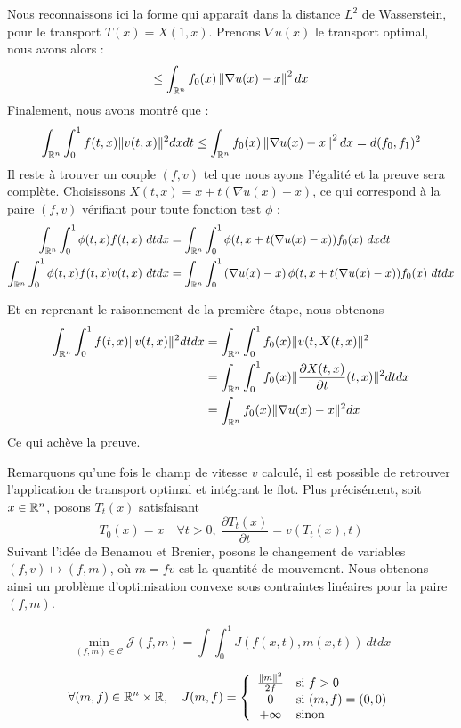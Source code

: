 \documentclass[a4paper,12pt]{article}
\begin{document}
\begin{preuve}
Nous reconnaissons ici la forme qui apparaît dans la distance $L^2$ de Wasserstein, pour le transport $T(x) = X(1,x)$. Prenons $\nabla u(x)$ le transport optimal, nous avons alors :  
$$
\leq \int_{\mathbb{R}^n} f_0(x)\left\| \nabla u(x)-x \right\|^2dx
$$
Finalement, nous avons montré que : 
$$
\int_{\mathbb{R}^n}\int_0^1 f(t,x)\|v(t,x)\|^2dxdt \leq \int_{\mathbb{R}^n} f_0(x)\left\| \nabla u(x)-x \right\|^2dx = d(f_0,f_1)^2
$$
Il reste à trouver un couple $(f,v)$ tel que nous ayons l'égalité et la preuve sera complète. Choisissons $X(t,x) = x+t(\nabla u(x)-x)$, ce qui correspond à la paire $(f,v)$ vérifiant pour toute fonction test $\phi$ : 
\begin{align*}
\int_{\mathbb{R}^n} \int_0^1 \phi(t,x)f(t,x)\ dtdx &=\int_{\mathbb{R}^n} \int_0^1 \phi(t, x+t(\nabla u(x)-x)) f_0(x)\ dxdt \\
\int_{\mathbb{R}^n} \int_0^1 \phi (t,x)f(t,x)v(t,x)\ dtdx &= \int_{\mathbb{R}^n} \int_0^1 \left(\nabla u (x) - x\right) \phi(t, x+t(\nabla u(x)-x)) f_0(x)\ dtdx
\end{align*}


Et en reprenant le raisonnement de la première étape, nous obtenons
\begin{align*}
\int_{\mathbb{R}^n} \int_0^1 f(t,x)\|v(t,x)\|^2dtdx &= \int_{\mathbb{R}^n} \int_0^1 f_0(x)\|v(t,X(t,x)\|^2\\
&= \int_{\mathbb{R}^n} \int_0^1 f_0(x) \|\frac{\partial X(t,x)}{\partial t}(t,x)\|^2 dtdx \\
&= \int_{\mathbb{R}^n} f_0(x) \|\nabla u(x) -x\|^2dx \\
\end{align*}
Ce qui achève la preuve. 
\end{preuve}

Remarquons qu'une fois le champ de vitesse $v$ calculé, il est possible de retrouver l'application de transport optimal et intégrant le flot. Plus précisément, soit $x\in \mathbb{R}^n$, posons $T_t(x)$ satisfaisant 
$$
T_0(x) = x \quad \forall t>0,\ \frac{\partial T_t(x)}{\partial t}=v(T_t(x),t)
$$
Suivant l'idée de Benamou et Brenier, posons le changement de variables $(f,v)\mapsto (f,m)$, où $m=fv$ est la quantité de mouvement. Nous obtenons ainsi un problème d'optimisation convexe sous contraintes linéaires pour la paire $(f,m)$. 

\begin{equation}
\tag{P}
\min_{(f,m)\in \mathcal{C}} \mathcal{J}(f,m)=\int\int_0^1 J(f(x,t),m(x,t))\ dtdx
\label{eq:pbm}
\end{equation}

\begin{align}
\forall (m,f)\in \mathbb{R}^n\times\mathbb{R}, \quad J(m,f) = \left\{\begin{array}{cl}
\frac{\|m\|^2}{2f} & \text{si } f>0 \\
0 &\text{si } (m,f) = (0,0)\\
+\infty & \text{sinon} 
\end{array}\right.
\end{align}
\end{document}
